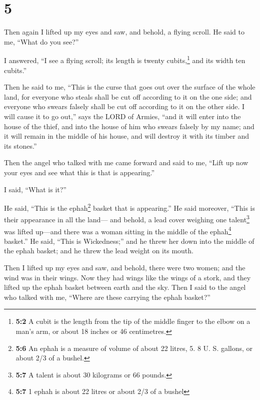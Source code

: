 \hypertarget{section-4}{%
\section{5}\label{section-4}}

 Then again I lifted up my eyes and saw, and behold, a
flying scroll.  He said to me, ``What do you see?''

I answered, ``I see a flying scroll; its length is twenty
cubits,\footnote{\textbf{5:2} A cubit is the length from the tip of the
  middle finger to the elbow on a man's arm, or about 18 inches or 46
  centimetres.} and its width ten cubits.''

 Then he said to me, ``This is the curse that goes out
over the surface of the whole land, for everyone who steals shall be cut
off according to it on the one side; and everyone who swears falsely
shall be cut off according to it on the other side.  I
will cause it to go out,'' says the LORD of Armies, ``and it will enter
into the house of the thief, and into the house of him who swears
falsely by my name; and it will remain in the middle of his house, and
will destroy it with its timber and its stones.''

 Then the angel who talked with me came forward and said
to me, ``Lift up now your eyes and see what this is that is appearing.''

 I said, ``What is it?''

He said, ``This is the ephah\footnote{\textbf{5:6} An ephah is a measure
  of volume of about 22 litres, 5. 8 U. S. gallons, or about 2/3 of a
  bushel.} basket that is appearing.'' He said moreover, ``This is their
appearance in all the land---  and behold, a lead cover
weighing one talent\footnote{\textbf{5:7} A talent is about 30 kilograms
  or 66 pounds.} was lifted up---and there was a woman sitting in the
middle of the ephah\footnote{\textbf{5:7} 1 ephah is about 22 litres or
  about 2/3 of a bushel} basket.''  He said, ``This is
Wickedness;'' and he threw her down into the middle of the ephah basket;
and he threw the lead weight on its mouth.

 Then I lifted up my eyes and saw, and behold, there were
two women; and the wind was in their wings. Now they had wings like the
wings of a stork, and they lifted up the ephah basket between earth and
the sky.  Then I said to the angel who talked with me,
``Where are these carrying the ephah basket?''

